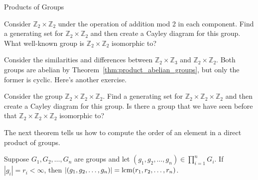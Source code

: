 \begin{section}{Products of Groups}
\begin{problem}
Consider $\mathbb{Z}_2\times \mathbb{Z}_2$ under the operation of addition mod 2 in each component.  Find a generating set for $\mathbb{Z}_2\times \mathbb{Z}_2$ and then create a Cayley diagram for this group.  What well-known group is $\mathbb{Z}_2\times \mathbb{Z}_2$ isomorphic to?
\end{problem}

Consider the similarities and differences between $\mathbb{Z}_2\times \mathbb{Z}_3$ and $\mathbb{Z}_2\times \mathbb{Z}_2$.  Both groups are abelian by Theorem~\ref{thm:product_abelian_groups}, but only the former is cyclic.  Here's another exercise.


\begin{problem}
Consider the group $\mathbb{Z}_2 \times \mathbb{Z}_2 \times \mathbb{Z}_2$.  Find a generating set for $\mathbb{Z}_2 \times \mathbb{Z}_2 \times \mathbb{Z}_2$ and then create a Cayley diagram for this group.  Is there a group that we have seen before that $\mathbb{Z}_2 \times \mathbb{Z}_2 \times \mathbb{Z}_2$ isomorphic to?
\end{problem}

The next theorem tells us how to compute the order of an element in a direct product of groups.

\begin{theorem}
Suppose $G_1, G_2,\ldots, G_n$ are groups and let $(g_1,g_2,\ldots, g_n)\in \prod_{i=1}^nG_i$.  If $|g_i|=r_i<\infty$, then $|(g_1,g_2,\ldots, g_n)|=\operatorname{lcm}(r_1,r_2,\ldots,r_n)$.
\end{theorem}


\end{section}
